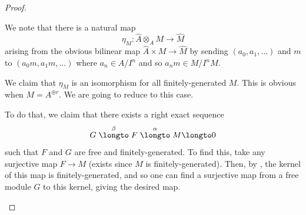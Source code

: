 \begin{proof}
    \begin{alphenum}
    \item We note that there is a natural map
    $$\eta_M : \widehat A \otimes_A M \to \widehat M$$
    arising from the obvious bilinear map 
    $\widehat A\times M \to \widehat M$ by sending
    $(a_0,a_1,\dots)$ and $m$ to $(a_0m, a_1m,\dots)$
    where $a_n\in A/I^n$ and so $a_nm\in M/I^nM$.
    
    We claim that $\eta_M$ is an isomorphism for all 
    finitely-generated $M$.
    This is obvious when $M=A^{\oplus r}$. 
    We are going to reduce to this case.

    To do that, we claim that there exists a right exact sequence
    $$G \stackrel\beta\longto F \stackrel\alpha\longto M\longto 0$$
    such that $F$ and $G$ are free and finitely-generated.
    To find this, take any surjective map $F\to M$
    (exists since $M$ is finitely-generated).
    Then, by ,
    the kernel of this map is finitely-generated,
    and so one can find a surjective map from a free module $G$
    to this kernel, giving the desired map.


\end{alphenum}
\end{proof}
